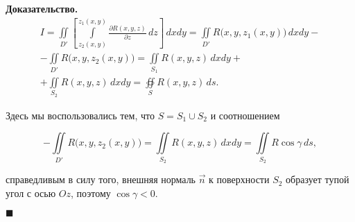 \documentclass[12pt, a4paper]{article} %
\newcommand{\dd}[2]{\frac{\partial#1}{\partial#2}}
\newenvironment{Proof}{\par\textbf{Доказательство. }}
	{\hfill$\blacksquare$\vspace{0.1cm}}
\begin{document}
\begin{Proof}
    \begin{multline*}
        I = \iint\limits_{D'} \left[ 
            \int\limits_{z_2(x, y)}^{z_1(x, y)} \dd{R(x, y, z)}{z}\,dz
        \right]\,dxdy =
        \iint\limits_{D'} R\bigl(x, y, z_1(x, y)\bigr)\,dxdy - \\
        - \iint\limits_{D'} R\bigl(x, y, z_2(x, y)\bigr) =
        \iint\limits_{S_1} R(x, y, z)\,dxdy + \\
        + \iint\limits_{S_2} R(x, y, z)\,dxdy =
        \oiint\limits_S R(x, y, z)\,ds.
    \end{multline*} 
    
    \noindent
    Здесь мы воспользовались тем, что $S = S_1 \cup S_2$ и соотношением

    \begin{equation*}
        - \iint\limits_{D'} R\bigl(x, y, z_2(x, y)\bigr) =
        \iint\limits_{S_2} R(x, y, z)\,dxdy =
        \iint\limits_{S_2} R\cos\gamma \, ds,
    \end{equation*} 

    \noindent
    справедливым в силу того, внешняя нормаль $\vec{n}$ к поверхности $S_2$
    образует тупой угол с осью $Oz$, поэтому  $\cos\gamma < 0$.

\end{Proof} 
    
\end{document}
